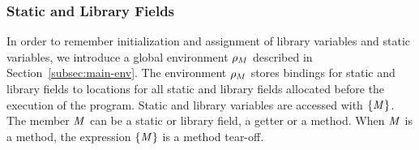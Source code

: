 \documentclass[a4paper,oneside,fleqn]{article}
\begin{document}
\subsubsection{Static and Library Fields}
\label{subsubsec:static-and-library-fields}

In order to remember initialization and assignment of library variables and static variables, we introduce a global environment $\rho_{M}$ described in Section~\ref{subsec:main-env}.
The environment $\rho_{M}$ stores bindings for static and library fields to locations for all static and library fields allocated before the execution of the program.
Static and library variables are accessed with $\{\mathit{M}\}$.
The member $\mathit{M}$ can be a static or library field, a getter or a method.
When $\mathit{M}$ is a method, the expression $\{\mathit{M}\}$ is a method tear-off.
\end{document}

